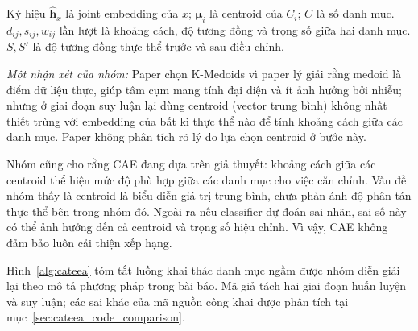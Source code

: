 Ký hiệu $\hat{\mathbf{h}}_x$ là joint embedding của $x$; $\boldsymbol{\mu}_i$ là centroid của $C_i$; $C$ là số danh mục. $d_{ij},s_{ij},w_{ij}$ lần lượt là khoảng cách, độ tương đồng và trọng số giữa hai danh mục. $S,S'$ là độ tương đồng thực thể trước và sau điều chỉnh.

\noindent\textit{Một nhận xét của nhóm:} Paper chọn K-Medoids vì paper lý giải rằng medoid là điểm dữ liệu thực, giúp tâm cụm mang tính đại diện và ít ảnh hưởng bởi nhiễu; nhưng ở giai đoạn suy luận lại dùng centroid (vector trung bình) không nhất thiết trùng với embedding của bất kì thực thể nào để tính khoảng cách giữa các danh mục. Paper không phân tích rõ lý do lựa chọn centroid ở bước này.

Nhóm cũng cho rằng CAE đang dựa trên giả thuyết: khoảng cách giữa các centroid thể hiện mức độ phù hợp giữa các danh mục cho việc căn chỉnh. Vấn đề nhóm thấy là centroid là biểu diễn giá trị trung bình, chưa phản ánh độ phân tán thực thể bên trong nhóm đó. Ngoài ra nếu classifier dự đoán sai nhãn, sai số này có thể ảnh hưởng đến cả centroid và trọng số hiệu chỉnh. Vì vậy, CAE không đảm bảo luôn cải thiện xếp hạng. 

\begin{samepage}
Hình~\ref{alg:cateea} tóm tắt luồng khai thác danh mục ngầm
được nhóm diễn giải lại theo mô tả phương pháp trong bài báo.
Mã giả tách hai giai đoạn huấn luyện và suy luận; các sai khác
của mã nguồn công khai được phân tích tại
mục~\ref{sec:cateea_code_comparison}.
\par
\end{samepage}

